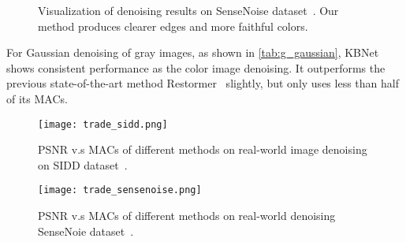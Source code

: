 \documentclass[default,iicol]{sn-jnl}
\theoremstyle{thmstyleone}\newtheorem{theorem}{Theorem}\newtheorem{proposition}[theorem]{Proposition}
\theoremstyle{thmstyletwo}\newtheorem{example}{Example}\newtheorem{remark}{Remark}
\theoremstyle{thmstylethree}\newtheorem{definition}{Definition}
\begin{document}
\begin{figure*}[!t]
\begin{center}
    \end{center}
\caption{Visualization of denoising results on SenseNoise dataset~\cite{zhang2021IDR}. Our method produces clearer edges and more faithful colors.
    }
    \label{fig:fig_sensenoise}
\end{figure*}  \begin{table*}[t]
 \caption{Denoising comparisons on SenseNoise~\cite{zhang2021IDR} dataset.}
    \begin{center}
    \setlength{\tabcolsep}{2.pt}
    \end{center}


    \label{table:sensenoise}
\end{table*} 
For Gaussian denoising of gray images, as shown in \cref{tab:g_gaussian}, KBNet shows consistent performance as the color image denoising. It outperforms the previous state-of-the-art method Restormer~\cite{restormer} slightly, but only uses less than half of its MACs.


\begin{figure}[t]
    \centering
    \texttt{[image: trade\_sidd.png]}
    \caption{PSNR v.s MACs of different methods on real-world image denoising on SIDD dataset~\cite{sidd}.}
    \label{fig:trade_sidd}
\end{figure}
\begin{figure}[t]
    \centering
    \texttt{[image: trade\_sensenoise.png]}
    \caption{PSNR  v.s MACs of different methods on real-world denoising SenseNoie dataset~\cite{zhang2021IDR}.}
    \label{fig:trade_sensenoise}
\end{figure}
\end{document}
